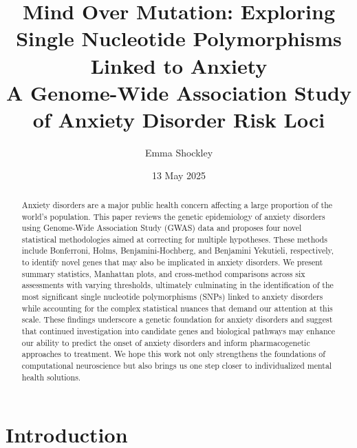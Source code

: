 \documentclass[12pt]{article}
\begin{document}
\title{\textbf{Mind Over Mutation: Exploring Single Nucleotide Polymorphisms Linked to Anxiety \vspace{0.1cm}\\
\large A Genome-Wide Association Study of Anxiety Disorder Risk Loci}}
\author{Emma Shockley}
\date{13 May 2025}
\maketitle

\begin{abstract}
Anxiety disorders are a major public health concern affecting a large proportion of the world's population. This paper reviews the genetic epidemiology of anxiety disorders using Genome-Wide Association Study (GWAS) data and proposes four novel statistical methodologies aimed at correcting for multiple hypotheses. These methods include Bonferroni, Holms, Benjamini-Hochberg, and Benjamini Yekutieli, respectively, to identify novel genes that may also be implicated in anxiety disorders. We present summary statistics, Manhattan plots, and cross-method comparisons across six assessments with varying thresholds, ultimately culminating in the identification of the most significant single nucleotide polymorphisms (SNPs) linked to anxiety disorders while accounting for the complex statistical nuances that demand our attention at this scale. These findings underscore a genetic foundation for anxiety disorders and suggest that continued investigation into candidate genes and biological pathways may enhance our ability to predict the onset of anxiety disorders and inform pharmacogenetic approaches to treatment. We hope this work not only strengthens the foundations of computational neuroscience but also brings us one step closer to individualized mental health solutions.
\end{abstract}
\newpage

\tableofcontents
\newpage

\section{Introduction}
\end{document}
